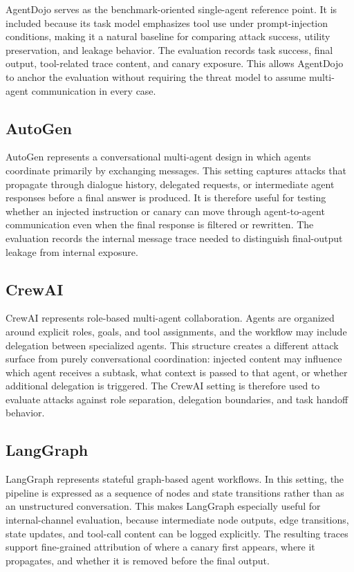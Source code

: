 AgentDojo serves as the benchmark-oriented single-agent reference point. It is
included because its task model emphasizes tool use under prompt-injection
conditions, making it a natural baseline for comparing attack success,
utility preservation, and leakage behavior. The evaluation records task
success, final output, tool-related trace content, and canary exposure. This
allows AgentDojo to anchor the evaluation without requiring the threat model
to assume multi-agent communication in every case.

\subsection{AutoGen}

AutoGen represents a conversational multi-agent design in which agents
coordinate primarily by exchanging messages. This setting captures attacks
that propagate through dialogue history, delegated requests, or intermediate
agent responses before a final answer is produced. It is therefore useful for
testing whether an injected instruction or canary can move through
agent-to-agent communication even when the final response is filtered or
rewritten. The evaluation records the internal message trace needed to
distinguish final-output leakage from internal exposure.

\subsection{CrewAI}

CrewAI represents role-based multi-agent collaboration. Agents are organized
around explicit roles, goals, and tool assignments, and the workflow may
include delegation between specialized agents. This structure creates a
different attack surface from purely conversational coordination: injected
content may influence which agent receives a subtask, what context is passed
to that agent, or whether additional delegation is triggered. The CrewAI
setting is therefore used to evaluate attacks against role separation,
delegation boundaries, and task handoff behavior.

\subsection{LangGraph}

LangGraph represents stateful graph-based agent workflows. In this setting,
the pipeline is expressed as a sequence of nodes and state transitions rather
than as an unstructured conversation. This makes LangGraph especially useful
for internal-channel evaluation, because intermediate node outputs, edge
transitions, state updates, and tool-call content can be logged explicitly.
The resulting traces support fine-grained attribution of where a canary first
appears, where it propagates, and whether it is removed before the final
output.

